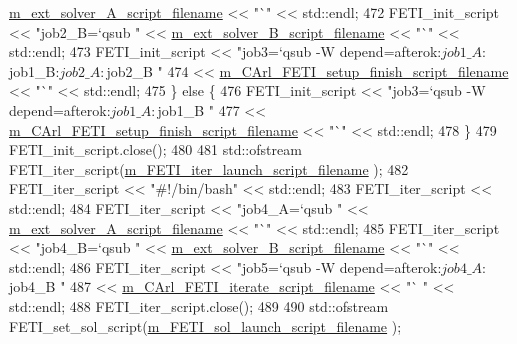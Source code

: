 \begin{DoxyCode}
      \hyperlink{classcarl_1_1_solver___files___setup_a181a314159810779c3c443082ae93563}{m\_ext\_solver\_A\_script\_filename} << \textcolor{stringliteral}{"`"} << std::endl;
472             FETI\_init\_script << \textcolor{stringliteral}{"job2\_B=`qsub "} << 
      \hyperlink{classcarl_1_1_solver___files___setup_a333e20119d68b1d0dda2494823ae08d4}{m\_ext\_solver\_B\_script\_filename} << \textcolor{stringliteral}{"`"} << std::endl;
473             FETI\_init\_script << \textcolor{stringliteral}{"job3=`qsub -W depend=afterok:$job1\_A:$job1\_B:$job2\_A:$job2\_B "}
474                             << \hyperlink{classcarl_1_1_solver___files___setup_a74f8cd1404471542269a1cc9aa8c8d84}{m\_CArl\_FETI\_setup\_finish\_script\_filename}
       << \textcolor{stringliteral}{"`"} << std::endl;
475         \} \textcolor{keywordflow}{else} \{
476             FETI\_init\_script << \textcolor{stringliteral}{"job3=`qsub -W depend=afterok:$job1\_A:$job1\_B "}
477                             << \hyperlink{classcarl_1_1_solver___files___setup_a74f8cd1404471542269a1cc9aa8c8d84}{m\_CArl\_FETI\_setup\_finish\_script\_filename}
       << \textcolor{stringliteral}{"`"} << std::endl;
478         \}
479         FETI\_init\_script.close();
480 
481         std::ofstream FETI\_iter\_script(\hyperlink{classcarl_1_1_solver___files___setup_a9f37bf7f6f91b9dcb29641268206a1a0}{m\_FETI\_iter\_launch\_script\_filename}
      );
482         FETI\_iter\_script << \textcolor{stringliteral}{"#!/bin/bash"} << std::endl;
483         FETI\_iter\_script << std::endl;
484         FETI\_iter\_script << \textcolor{stringliteral}{"job4\_A=`qsub "} << \hyperlink{classcarl_1_1_solver___files___setup_a181a314159810779c3c443082ae93563}{m\_ext\_solver\_A\_script\_filename}
       << \textcolor{stringliteral}{"`"} << std::endl;
485         FETI\_iter\_script << \textcolor{stringliteral}{"job4\_B=`qsub "} << \hyperlink{classcarl_1_1_solver___files___setup_a333e20119d68b1d0dda2494823ae08d4}{m\_ext\_solver\_B\_script\_filename}
       << \textcolor{stringliteral}{"`"} << std::endl;
486         FETI\_iter\_script << \textcolor{stringliteral}{"job5=`qsub -W depend=afterok:$job4\_A:$job4\_B "}
487                             << \hyperlink{classcarl_1_1_solver___files___setup_a9ce875697a888d84dbd186f74e64cd6a}{m\_CArl\_FETI\_iterate\_script\_filename} << \textcolor{stringliteral}{"`
      "} << std::endl;
488         FETI\_iter\_script.close();
489 
490         std::ofstream FETI\_set\_sol\_script(\hyperlink{classcarl_1_1_solver___files___setup_a79c7bb3275ef8c1aee1e6dc857c0b0ea}{m\_FETI\_sol\_launch\_script\_filename}
      );

\end{DoxyCode}

